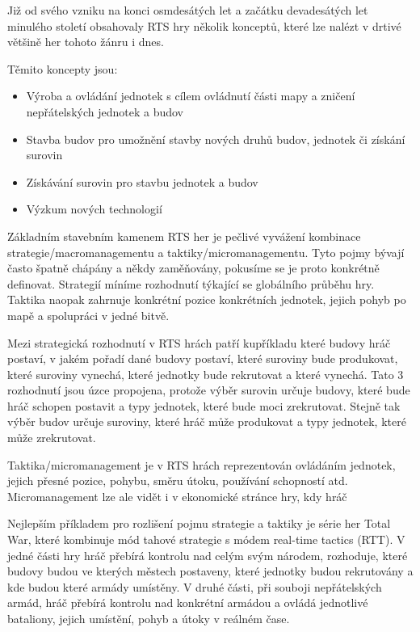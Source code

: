 Již od svého vzniku na konci osmdesátých let a začátku devadesátých let minulého století  obsahovaly RTS hry několik konceptů, které lze nalézt v drtivé většině her tohoto žánru i dnes. 

Těmito koncepty jsou:
\begin{itemize}
	\item Výroba a ovládání jednotek s cílem ovládnutí části mapy a zničení nepřátelských jednotek a budov
	\item Stavba budov pro umožnění stavby nových druhů budov, jednotek či získání surovin
	\item Získávání surovin pro stavbu jednotek a budov
	\item Výzkum nových technologií
\end{itemize}

Základním stavebním kamenem RTS her je pečlivé vyvážení kombinace strategie/macromanagementu a taktiky/micromanagementu. Tyto pojmy bývají často špatně chápány a někdy zaměňovány, pokusíme se je proto konkrétně definovat. Strategií míníme  rozhodnutí týkající se globálního průběhu hry. Taktika  naopak zahrnuje konkrétní pozice konkrétních jednotek, jejich pohyb po mapě a spolupráci v jedné bitvě. 

Mezi strategická rozhodnutí v RTS hrách patří kupříkladu které budovy hráč postaví, v jakém pořadí dané budovy postaví, které suroviny bude produkovat, které suroviny vynechá, které jednotky bude rekrutovat a které vynechá.  Tato 3 rozhodnutí jsou úzce propojena, protože výběr surovin určuje budovy, které bude hráč schopen postavit a typy jednotek, které bude moci zrekrutovat. Stejně tak výběr budov určuje suroviny, které hráč může produkovat a typy jednotek, které může zrekrutovat. 

Taktika/micromanagement je v RTS hrách reprezentován ovládáním jednotek, jejich přesné pozice, pohybu, směru útoku, používání schopností atd. Micromanagement lze ale vidět i v ekonomické stránce hry, kdy hráč 

Nejlepším příkladem pro rozlišení pojmu strategie a taktiky je série her Total War, které kombinuje mód tahové strategie s módem real-time tactics (RTT). V jedné části hry hráč přebírá kontrolu nad celým svým národem, rozhoduje, které budovy budou ve kterých městech postaveny, které jednotky budou rekrutovány a kde budou které armády umístěny. V druhé části, při souboji nepřátelských armád, hráč přebírá kontrolu nad konkrétní armádou a ovládá jednotlivé bataliony, jejich umístění, pohyb a útoky v reálném čase.

